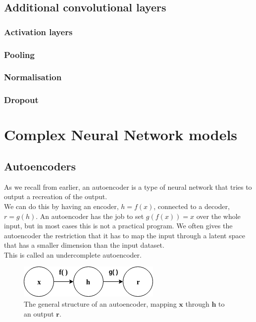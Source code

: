 \subsection{Additional convolutional layers}
\subsubsection{Activation layers}
\subsubsection{Pooling}
\subsubsection{Normalisation}
\subsubsection{Dropout}


\section{Complex Neural Network models}

    \subsection{Autoencoders}\label{Explaining_autoencoders}
As we recall from earlier, an autoencoder is a type of neural network that tries to output a recreation of the output. \\ 

We can do this by having an encoder, $h=f(x)$, connected to a decoder, $r=g(h)$. 
An autoencoder has the job to set $g(f(x))=x$ over the whole input, but in most cases this is not a practical program. We often gives the autoencoder the restriction
that it has to map the input through a latent space that has a smaller dimension than the input dataset.\\
This is called an undercomplete autoencoder.\\
\vspace{10px}
\begin{figure}[ht!]
	\centering
	\includegraphics[scale=0.5]{background/figures/SimpleAE.png}
	\caption{The general structure of an autoencoder, mapping $\textbf{x}$ through $\textbf{h}$ to an output $\textbf{r}$.}
\end{figure}

